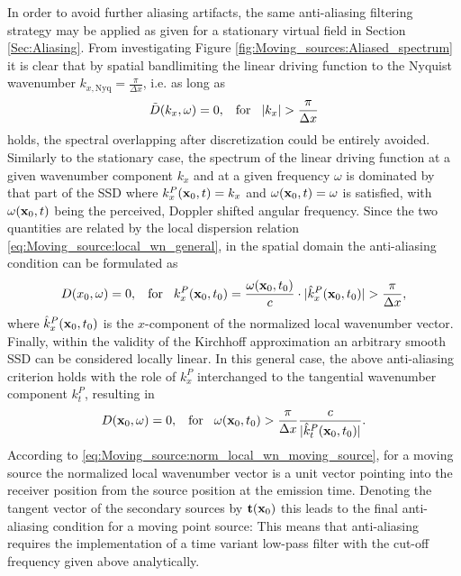 In order to avoid further aliasing artifacts, the same anti-aliasing filtering strategy may be applied as given for a stationary virtual field in Section \ref{Sec:Aliasing}.
From investigating Figure \ref{fig:Moving_sources:Aliased_spectrum} it is clear that by spatial bandlimiting the linear driving function to the Nyquist wavenumber $k_{x,\mathrm{Nyq}} = \frac{\pi}{\Delta x}$, i.e. as long as 
\begin{equation}
\tilde{D}(k_x,\omega) = 0, \hspace{3mm} \text{for} \hspace{3mm}  |k_x| > \frac{\pi}{\Delta x}
\end{equation}
holds, the spectral overlapping after discretization could be entirely avoided.
Similarly to the stationary case, the spectrum of the linear driving function at a given wavenumber component $k_x$ and at a given frequency $\omega$ is dominated by that part of the SSD where $k_x^P(\mathbf{x}_0,t) = k_x$ and $\omega(\mathbf{x}_0,t) = \omega$ is satisfied, with $\omega(\mathbf{x}_0,t)$ being the perceived, Doppler shifted angular frequency.
Since the two quantities are related by the local dispersion relation \eqref{eq:Moving_source:local_wn_general}, in the spatial domain the anti-aliasing condition can be formulated as
\begin{equation}
D(x_0,\omega) = 0, \hspace{3mm} \text{for} \hspace{3mm}  k_x^P(\mathbf{x}_0,t_0) = \frac{\omega(\mathbf{x}_0,t_0)}{c} \cdot |\hat{k}_x^P(\mathbf{x}_0,t_0)|  > \frac{\pi}{\Delta x},
\end{equation}
where $\hat{k}_x^P(\mathbf{x}_0,t_0)$ is the $x$-component of the normalized local wavenumber vector.
Finally, within the validity of the Kirchhoff approximation an arbitrary smooth SSD can be considered locally linear.
In this general case, the above anti-aliasing criterion holds with the role of $k_x^P$ interchanged to the tangential wavenumber component $k_t^P$, resulting in 
\begin{equation}
D(\mathbf{x}_0,\omega) = 0, \hspace{3mm} \text{for} \hspace{3mm} \omega(\mathbf{x}_0,t_0) > \frac{\pi}{\Delta x} \frac{c}{|\hat{k}_t^P(\mathbf{x}_0,t_0)|}.
\end{equation}
According to \eqref{eq:Moving_source:norm_local_wn_moving_source}, for a moving source the normalized local wavenumber vector is a unit vector pointing into the receiver position from the source position at the emission time.
Denoting the tangent vector of the secondary sources by $\mathbf{t}(\mathbf{x}_0)$ this leads to the final anti-aliasing condition for a moving point source:
This means that anti-aliasing requires the implementation of a time variant low-pass filter with the cut-off frequency given above analytically.

